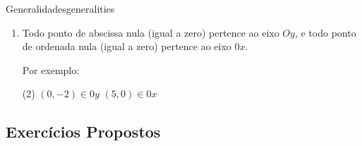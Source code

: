 \begin{proposition}{Generalidades}{generalities}
\begin{enumerate}
    Os pontos dos eixos coordenados não pertencem a nenhum quadrante.

    \item Todo ponto de abscissa nula (igual a zero) pertence ao eixo $Oy$, e todo ponto de ordenada nula 
      (igual a zero) pertence ao eixo $0x$.

      \vspace{.2cm}
      Por exemplo:

      \vspace{.2cm}
      \begin{tasks}(2)
        \task[\#] $(0,-2) \in 0y$
        \task[\#] $(5,0) \in 0x$
      \end{tasks}
  \end{enumerate} 
\end{proposition}

\subsection{Exercícios Propostos}


